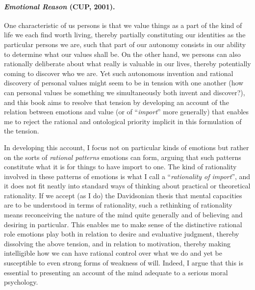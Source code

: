 \documentclass[%
  11pt,%
]{article}
\let\oldparagraph\paragraph
\renewcommand\paragraph[1]{\oldparagraph{\textcolor{myblue}{#1}}}
\begin{document}
\paragraph{\emph{Emotional Reason} (CUP, 2001).}

One characteristic of us persons is that we value things as a part of the kind of life we each find worth living, thereby partially constituting our identities as the particular persons we are, such that part of our autonomy consists in our ability to determine what our values shall be. On the other hand, we persons can also rationally deliberate about what really is valuable in our lives, thereby potentially coming to discover who we are. Yet such autonomous invention and rational discovery of personal values might seem to be in tension with one another (how can personal values be something we simultaneously both invent and discover?), and this book aims to resolve that tension by developing an account of the relation between emotions and value (or of \enquote{\emph{import}} more generally) that enables me to reject the rational and ontological priority implicit in this formulation of the tension.

In developing this account, I focus not on particular kinds of emotions but rather on the sorts of \emph{rational patterns} emotions can form, arguing that such patterns constitute what it is for things to have import to one. The kind of rationality involved in these patterns of emotions is what I call a \enquote{\emph{rationality of import}}, and it does not fit neatly into standard ways of thinking about practical or theoretical rationality. If we accept (as I do) the Davidsonian thesis that mental capacities are to be understood in terms of rationality, such a rethinking of rationality means reconceiving the nature of the mind quite generally and of believing and desiring in particular. This enables me to make sense of the distinctive rational role emotions play both in relation to desire and evaluative judgment, thereby dissolving the above tension, and in relation to motivation, thereby making intelligible how we can have rational control over what we do and yet be susceptible to even strong forms of weakness of will. Indeed, I argue that this is essential to presenting an account of the mind adequate to a serious moral psychology.

\end{document}
